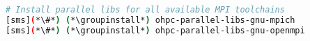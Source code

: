 
\begin{lstlisting}[language=bash,keywords={},upquote=true,keepspaces]
# Install parallel libs for all available MPI toolchains
[sms](*\#*) (*\groupinstall*) ohpc-parallel-libs-gnu-mpich
[sms](*\#*) (*\groupinstall*) ohpc-parallel-libs-gnu-openmpi
\end{lstlisting}
